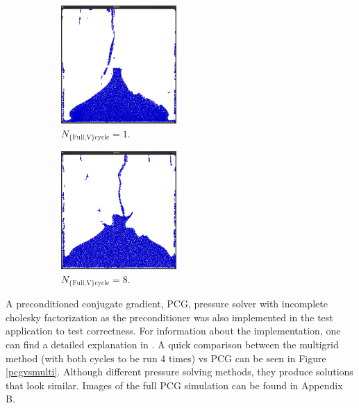 \begin{figure}[ht!]
\centering
\begin{subfigure}[]{0.3\textwidth}
\includegraphics[height=45mm]{png/multigridN1.png}
\caption{$N_{\text{\{Full,V\} cycle}} = 1$.}
\end{subfigure}
\begin{subfigure}[]{0.3\textwidth}
\includegraphics[height=45mm]{png/multigridN8.png}
\caption{$N_{\text{\{Full,V\} cycle}} = 8$.}
\end{subfigure}
\caption{}
\label{lowvshigh}
\end{figure}
\noindent
A preconditioned conjugate gradient, PCG, pressure solver with incomplete cholesky factorization as the preconditioner was also implemented in the test application to test correctness. For information about the implementation, one can find a detailed explanation in \cite{bridson}. A quick comparison between the multigrid method (with both cycles to be run 4 times) vs PCG can be seen in Figure \ref{pcgvsmulti}. Although different pressure solving methods, they produce solutions that look similar. Images of the full PCG simulation can be found in Appendix B. 

